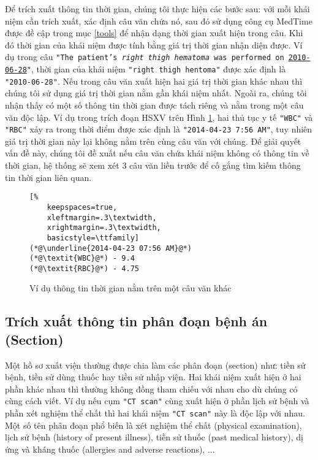 Để trích xuất thông tin thời gian, chúng tôi thực hiện các bước sau: với mỗi khái niệm cần trích xuất, xác định câu văn chứa nó, sau đó sử dụng công cụ MedTime được đề cập trong mục \ref{tools} để nhận dạng thời gian xuất hiện trong câu. Khi đó thời gian của khái niệm được tính bằng giá trị thời gian nhận diện được. Ví dụ trong câu \texttt{"The patient's \textsl{right thigh hematoma} was performed on \underline{2010-06-28}"}, thời gian của khái niệm \texttt{"right thigh hentoma"} được xác định là \texttt{"2010-06-28"}. Nếu trong câu văn xuất hiện hai giá trị thời gian khác nhau thì chúng tôi sử dụng giá trị thời gian nằm gần khái niệm nhất. Ngoài ra, chúng tôi nhận thấy có một số thông tin thời gian được tách riêng và nằm trong một câu văn độc lập. Ví dụ trong trích đoạn HSXV trên Hình \ref{fig:eg-sep-time}, hai thủ tục y tế \texttt{"WBC"} và \texttt{"RBC"} xảy ra trong thời điểm được xác định là \texttt{"2014-04-23 7:56 AM"}, tuy nhiên giá trị thời gian này lại không nằm trên cùng câu văn với chúng. Để giải quyết vấn đề này, chúng tôi đề xuất nếu câu văn chứa khái niệm không có thông tin về thời gian, hệ thống sẽ xem xét 3 câu văn liền trước để cố gắng tìm kiếm thông tin thời gian liên quan.

\begin{figure}[ht]
\centering
\begin{lstlisting}[%
	keepspaces=true,
	xleftmargin=.3\textwidth,
	xrightmargin=.3\textwidth,
	basicstyle=\ttfamily]
(*@\underline{2014-04-23 07:56 AM}@*)
(*@\textit{WBC}@*) - 9.4
(*@\textit{RBC}@*) - 4.75
\end{lstlisting}
\caption{Ví dụ thông tin thời gian nằm trên một câu văn khác\label{fig:eg-sep-time}}
\end{figure}

\subsection*{Trích xuất thông tin phân đoạn bệnh án (Section)}
Một hồ sơ xuất viện thường được chia làm các phân đoạn (section) như: tiền sử bệnh, tiền sử dùng thuốc hay tiền sử nhập viện. Hai khái niệm xuất hiện ở hai phần khác nhau thì thường không đồng tham chiếu với nhau cho dù chúng có cùng cách viết. Ví dụ nếu cụm \texttt{"CT scan"} cùng xuất hiện ở phần lịch sử bệnh và phần xét nghiệm thể chất thì hai khái niệm \texttt{"CT scan"} này là độc lập với nhau. Một số tên phân đoạn phổ biến là xét nghiệm thể chất (physical examination), lịch sử bệnh (history of present illness), tiền sử thuốc (past medical history), dị ứng và kháng thuốc (allergies and adverse reactions), ...

